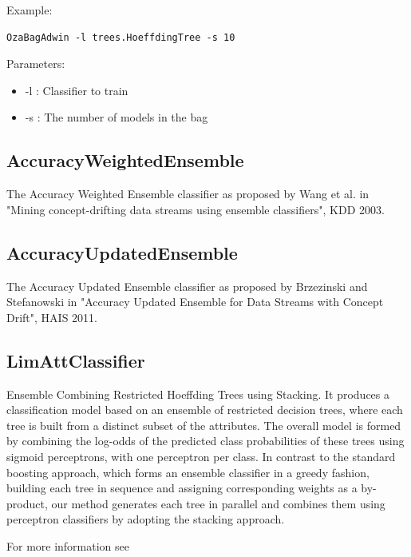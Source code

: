 \documentclass[a4paper,12pt,twoside]{book}
\begin{document}
Example:
\begin{footnotesize}\begin{verbatim}
OzaBagAdwin -l trees.HoeffdingTree -s 10
\end{verbatim}\end{footnotesize}

Parameters:
\begin{itemize}
\item -l : Classifier to train
\item -s : The number of models in the bag
\end{itemize}


 
\subsection{AccuracyWeightedEnsemble}

  The Accuracy Weighted Ensemble classifier as proposed 
  by Wang et al. in "Mining concept-drifting data streams using ensemble classifiers",
   KDD 2003.

\subsection{AccuracyUpdatedEnsemble}

  The Accuracy Updated Ensemble classifier as proposed 
  by Brzezinski and Stefanowski in "Accuracy Updated Ensemble for Data Streams 
  with Concept Drift", HAIS 2011.

\subsection{LimAttClassifier}


  Ensemble Combining Restricted Hoeffding Trees using Stacking.
  It produces a classification model based on an
  ensemble of restricted decision trees, where each tree is built from a
  distinct subset of the attributes. The overall model is formed by
  combining the log-odds of the predicted class probabilities of these trees
  using sigmoid perceptrons, with one perceptron per class.
  In contrast to the standard boosting approach,
  which forms an ensemble classifier in a greedy fashion, building each tree in
  sequence and assigning corresponding weights as a by-product, our
  method generates each tree in parallel and combines them using perceptron
  classifiers by adopting the stacking approach.
 
  For more information see
 
\end{document}
